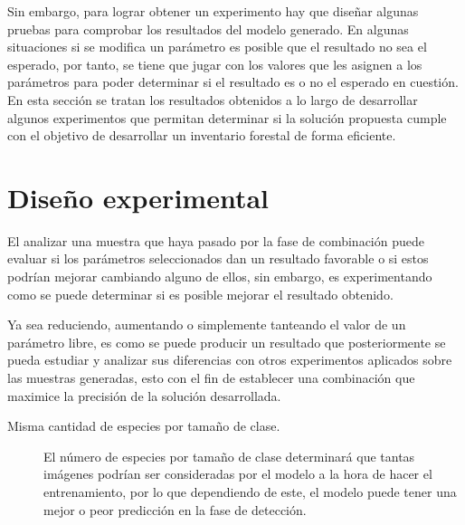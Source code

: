 Sin embargo, para lograr obtener un experimento hay que diseñar algunas pruebas para comprobar los resultados del modelo generado. En algunas situaciones si se modifica un parámetro es posible que el resultado no sea el esperado, por tanto, se tiene que jugar con los valores que les asignen a los parámetros para poder determinar si el resultado es o no el esperado en cuestión. En esta sección se tratan los resultados obtenidos a lo largo de desarrollar algunos experimentos que permitan determinar si la solución propuesta cumple con el objetivo de desarrollar un inventario forestal de forma eficiente.
\clearpage

\section{Diseño experimental}
El analizar una muestra que haya pasado por la fase de combinación puede evaluar si los parámetros seleccionados dan un resultado favorable o si estos podrían mejorar cambiando alguno de ellos, sin embargo, es experimentando como se puede determinar si es posible mejorar el resultado obtenido. 

Ya sea reduciendo, aumentando o simplemente tanteando el valor de un parámetro libre, es como se puede producir un resultado que posteriormente se pueda estudiar y analizar sus diferencias con otros experimentos aplicados sobre las muestras generadas, esto con el fin de establecer una combinación que maximice la precisión de la solución desarrollada.

\begin{description}
\item[Misma cantidad de especies por tamaño de clase.]{El número de especies por tamaño de clase determinará que tantas imágenes podrían ser consideradas por el modelo a la hora de hacer el entrenamiento, por lo que dependiendo de este, el modelo puede tener una mejor o peor predicción en la fase de detección.} 
\end{description}

